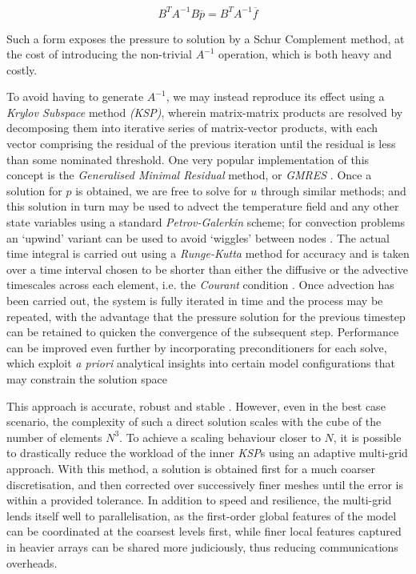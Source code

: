 \documentclass[a4paper,11pt,oneside]{book}
\begin{document}
\begin{equation}
B^T A^{-1} B \overline{p} = B^T A^{-1} \overline{f}
\end{equation}

Such a form exposes the pressure to solution by a Schur Complement method, at the cost of introducing the non-trivial $A^{ -1}$ operation, which is both heavy and costly.

To avoid having to generate $A^{ -1}$, we may instead reproduce its effect using a \textit{Krylov Subspace} method \textit{(KSP)}, wherein matrix-matrix products are resolved by decomposing them into iterative series of matrix-vector products, with each vector comprising the residual of the previous iteration until the residual is less than some nominated threshold. One very popular implementation of this concept is the \textit{Generalised Minimal Residual} method, or \textit{GMRES} \cite{Saad1986-kq}. Once a solution for $p$ is obtained, we are free to solve for $u$ through similar methods; and this solution in turn may be used to advect the temperature field and any other state variables using a standard \textit{Petrov-Galerkin} scheme; for convection problems an `upwind' variant can be used to avoid `wiggles' between nodes \cite{Brooks1982-ye}. The actual time integral is carried out using a \textit{Runge-Kutta} method for accuracy \cite{Hairer2006-ea} and is taken over a time interval chosen to be shorter than either the diffusive or the advective timescales across each element, i.e. the \textit{Courant} condition \cite{Courant1967-as}. Once advection has been carried out, the system is fully iterated in time and the process may be repeated, with the advantage that the pressure solution for the previous timestep can be retained to quicken the convergence of the subsequent step. Performance can be improved even further by incorporating preconditioners for each solve, which exploit \textit{a priori} analytical insights into certain model configurations that may constrain the solution space \cite{May2008-pq}

This approach is accurate, robust and stable \cite{Moresi1995-rn}. However, even in the best case scenario, the complexity of such a direct solution scales with the cube of the number of elements $N^3$. To achieve a scaling behaviour closer to $N$, it is possible to drastically reduce the workload of the inner \textit{KSP}s using an adaptive multi-grid approach. With this method, a solution is obtained first for a much coarser discretisation, and then corrected over successively finer meshes until the error is within a provided tolerance. In addition to speed and resilience, the multi-grid lends itself well to parallelisation, as the first-order global features of the model can be coordinated at the coarsest levels first, while finer local features captured in heavier arrays can be shared more judiciously, thus reducing communications overheads.
\end{document}
